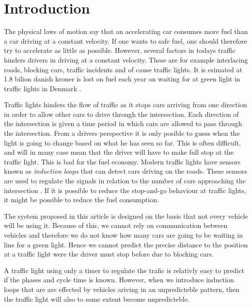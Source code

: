 \section{Introduction}

The physical laws of motion say that an accelerating car consumes more fuel than a car driving at a constant velocity. %
If one wants to safe fuel, one should therefore try to accelerate as little as possible. 
However, several factors in todays traffic hinders drivers in driving at a constant velocity. 
These are for example interlacing roads, blocking cars, traffic incidents and of cause traffic lights. 
It is esimated at 1.8 bilion danish kroner is lost on fuel each year on waiting for at green light in traffic lights in Denmark \cite{Vejdir}.

Traffic lights hinders the flow of traffic as it stops cars arriving from one direction in order to allow other cars to drive through the intersection.
Each direction of the intersection is given a time period in which cars are allowed to pass through the intersection. 
From a drivers perspective it is only posible to guess when the light is going to change based on what he has seen so far. 
This is often difficult, and will in many case mean that the driver will have to make full stop at the traffic light. This is bad for the fuel economy.
Modern traffic lights have sensors known as \textit{induction loops} that can detect cars driving on the roads.
These sensors are used to regulate the signals in relation to the number of cars approaching the intersection \cite{Vejdir}.
If it is possible to reduce the stop-and-go behaviour at traffic lights, it might be possible to reduce the fuel consumption.




The system proposed in this article is designed on the basis that not every vehicle will be using it. 
Because of this, we cannot rely on communication between vehicles and therefore we do not know how many cars are going to be waiting in line for a green light. %
Hence we cannot predict the precise distance to the position at a traffic light were the driver must stop before due to blocking cars.

A traffic light using only a timer to regulate the trafic is relativly easy to predict if the phases and cycle time is known. 
However, when we introduce induction loops that are are effected by vehicles ariving in an unpredicteble pattern, then the traffic light will also to some extent become unpredicteble. 

